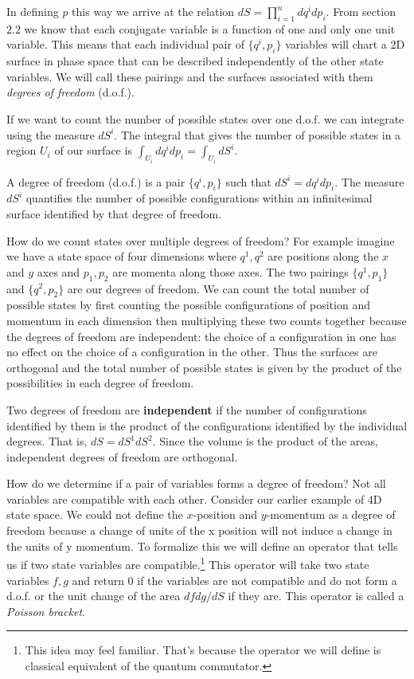 \documentclass{article}[a4paper]
\begin{document}
	In defining $p$ this way we arrive at the relation $dS = \prod \limits_{i = 1}^{n} dq^{i}dp_i$. From section $2.2$ we know that each conjugate variable is a function of one and only one unit variable. This means that each individual pair of $\{q^i,p_i\}$ variables will chart a 2D surface in phase space that can be described independently of the other state variables. We will call these pairings and the surfaces associated with them \textit{degrees of freedom} (d.o.f.).
	
	If we want to count the number of possible states over one d.o.f. we can integrate using the measure $dS^i$. The integral that gives the number of possible states in a region $U_i$ of our surface is $\int_{U_i} dq^i dp_i = \int_{U_i} dS^i$.

\begin{defn}
	A degree of freedom (d.o.f.) is a pair $\{q^i,p_i \}$ such that $dS^i = dq^i dp_i$. The measure $dS^i$ quantifies the number of possible configurations within an infinitesimal surface identified by that degree of freedom.
\end{defn}

	How do we count states over multiple degrees of freedom? For example imagine we have a state space of four dimensions where $q^1,q^2$ are positions along the $x$ and $y$ axes and $p_1,p_2$ are momenta along those axes. The two pairings $\{q^1,p_1 \}$ and $\{q^2,p_2 \}$ are our degrees of freedom. We can count the total number of possible states by first counting the possible configurations of position and momentum in each dimension then multiplying these two counts together because the degrees of freedom are independent: the choice of a configuration in one has no effect on the choice of a configuration in the other. Thus the surfaces are orthogonal and the total number of possible states is given by the product of the possibilities in each degree of freedom.

\begin{defn}
	Two degrees of freedom are \textbf{independent} if the number of configurations identified by them is the product of the configurations identified by the individual degrees. That is, $dS = dS^1 dS^2$. Since the volume is the product of the areas, independent degrees of freedom are orthogonal.
\end{defn}

	How do we determine if a pair of variables forms a degree of freedom? Not all variables are compatible with each other. Consider our earlier example of 4D state space. We could not define the $x$-position and $y$-momentum as a degree of freedom because a change of units of the x position will not induce a change in the units of y momentum. To formalize this we will define an operator that tells us if two state variables are compatible.\footnote{This idea may feel familiar. That's because the operator we will define is classical equivalent of the quantum commutator.} This operator will take two state variables $f,g$ and return 0 if the variables are not compatible and do not form a d.o.f. or the unit change of the area $dfdg/dS$ if they are. This operator is called a \textit{Poisson bracket}.
\end{document}
